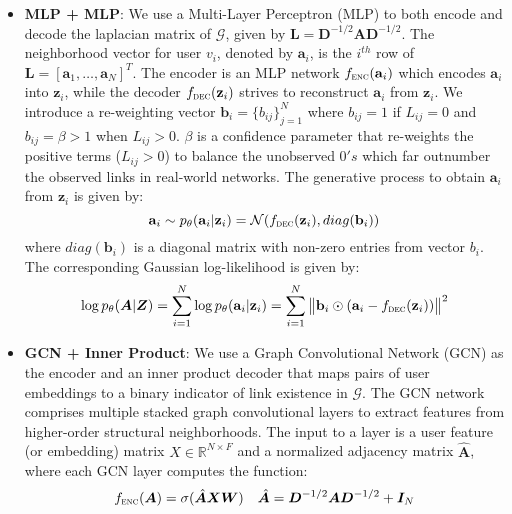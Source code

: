 \documentclass[sigconf]{acmart}
\def\rva{{\mathbf{a}}}
\def\rvb{{\mathbf{b}}}
\def\rvz{{\mathbf{z}}}
\def\mA{{\bm{A}}}
\def\mD{{\bm{D}}}
\def\mI{{\bm{I}}}
\def\mL{{\bm{L}}}
\def\mW{{\bm{W}}}
\def\mX{{\bm{X}}}
\def\mZ{{\bm{Z}}}
\def\gG{{\mathcal{G}}}
\def\gN{{\mathcal{N}}}
\def\sR{{\mathbb{R}}}
\begin{document}
\begin{itemize}[leftmargin=*]
\item \textbf{MLP + MLP}: We use a Multi-Layer Perceptron (MLP) to both encode and decode the laplacian matrix of $\gG$, given by $\mL = \mD^{-1/2} \mA \mD^{-1/2}$. The neighborhood vector for user $v_i$, denoted by $\rva_i$, is the $i^{th}$ row of $\mL =  [\rva_1, \dots, \rva_N ]^T$.
The encoder is an MLP network $f_{\textsc{enc}} (\rva_i)$ which encodes $\rva_i$ into $\rvz_i$, while the decoder $f_{\textsc{dec}} (\rvz_i)$ strives to reconstruct $\rva_i$ from $\rvz_i$.
We introduce a re-weighting vector $\rvb_i = \{ b_{ij} \}_{j=1}^N$ where $b_{ij} = 1$ if $L_{ij} =0$ and $b_{ij} = \beta >1$ when $L_{ij} >0 $.
$\beta$ is a confidence parameter that re-weights the positive terms ($L_{ij} > 0$) to balance the unobserved $0's$ which far outnumber the observed links in real-world networks.
The generative process to obtain $\rva_i$ from $\rvz_i$ is given by:
\vspace{-2pt}
\begin{equation*}
\rva_i \sim p_\theta (\rva_i | \rvz_i) = \gN (f_{\textsc{dec}} (\rvz_i),  diag(\rvb_i))
\end{equation*}
where $diag(\rvb_i)$ is a diagonal matrix with non-zero entries from vector $b_i$.
The corresponding Gaussian log-likelihood is given by:
\vspace{-2pt}
\begin{equation*}
\log p_{\theta} (\mA | \mZ) = \sum\limits_{i=1}^N \log p_{\theta} (\rva_i | \rvz_i)  =  \sum\limits_{i=1}^N \big\Vert \rvb_i \odot (\rva_i - f_{\textsc{dec}}(\rvz_i))\big\Vert^2 
\end{equation*}
\item \textbf{GCN + Inner Product}: We use a Graph Convolutional Network (GCN) as the encoder and an inner product decoder that maps pairs of user embeddings to a binary indicator of link existence in $\gG$. The GCN network comprises multiple stacked graph convolutional layers to extract features from higher-order structural neighborhoods.
The input to a layer is 
a user feature (or embedding) matrix $X \in \sR^{N \times F}$ and a normalized adjacency matrix $\hat{\mA}$, where each GCN layer computes the function:
\vspace{-2pt}
$$f_{\textsc{enc}} (\mA) = \sigma(\hat{\mA} \mX \mW) \hspace{10pt} \hat{\mA} = \mD^{-1/2} \mA \mD^{-1/2} + \mI_N$$


\end{itemize}
\end{document}
